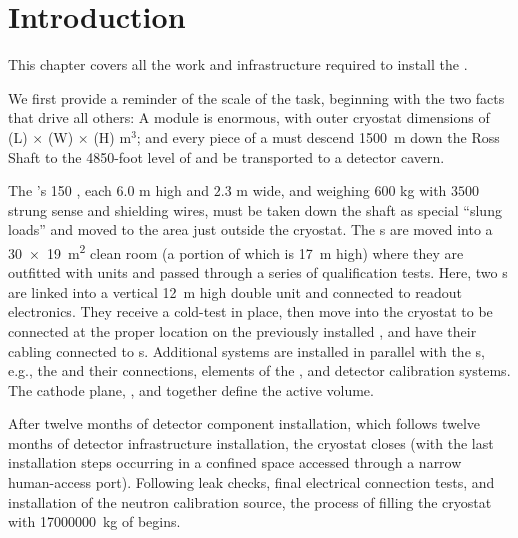 
\section{Introduction}
\label{ch:sp-install-intro}

This chapter covers all the work and infrastructure required to install the . 
 
We first provide a reminder of the scale of the task, beginning with the two facts that drive all others: A   module is enormous, with outer cryostat dimensions  of 
\cryostatlen{}(L) $\times$ \cryostatwdth{}(W) $\times$ \cryostatht{}(H) m$^{3}$; 
and every piece of a  must descend 
\SI{1500}{m} down the Ross Shaft to the 4850-foot level of  and be transported to a detector cavern.


The 's 150 , each $6.0$ m high and $2.3$ m wide, and  weighing $600$ kg with $3500$ strung sense and shielding wires, must be taken down the shaft as special ``slung loads'' and moved to the area just outside the  cryostat. 
The s are moved into a \SI{30x19}{\square\meter} clean room (a portion of which is \SI{17}{m} high) where they are outfitted  with  units and passed through a series of qualification tests.
Here, two s are linked into a vertical \SI{12}{m} high double unit and connected to readout electronics. 
They receive a cold-test in place, then move into the cryostat to be connected at the proper location on the previously installed , and have their cabling connected to \fdth{}s. 
Additional systems are installed in parallel with the s, e.g., the  and their  connections, elements of the , and detector calibration systems. The cathode plane, , and  together define the  active volume. 


After twelve months of detector component installation, which follows twelve months of detector infrastructure installation, the cryostat closes (with the last installation steps occurring in a confined space accessed through a narrow human-access port). 
Following leak checks, final electrical connection tests, and installation of the neutron calibration source, the process of filling the cryostat with \SI{17000000}{\kilo\gram} of  begins.

